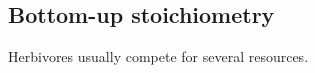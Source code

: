 \documentclass[12pt]{article}
\newcommand\barre[1]{\overline{\rule{0pt}{1.5ex}#1}}
\begin{document}
\subsection*{Bottom-up stoichiometry}
Herbivores usually compete for several resources.  
%
%
\end{document}
